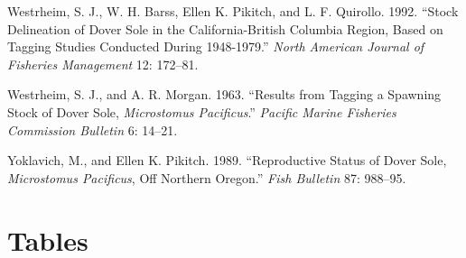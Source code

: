 \documentclass[11pt,
  english,
  a4paper,
]{article}
\begin{document}
\begin{cslreferences}
\leavevmode\hypertarget{ref-westrheim_stock_1992}{}%
Westrheim, S. J., W. H. Barss, Ellen K. Pikitch, and L. F. Quirollo. 1992. ``Stock Delineation of Dover Sole in the California-British Columbia Region, Based on Tagging Studies Conducted During 1948-1979.'' \emph{North American Journal of Fisheries Management} 12: 172--81.

\leavevmode\hypertarget{ref-westrheim_results_1963}{}%
Westrheim, S. J., and A. R. Morgan. 1963. ``Results from Tagging a Spawning Stock of Dover Sole, \emph{Microstomus Pacificus}.'' \emph{Pacific Marine Fisheries Commission Bulletin} 6: 14--21.

\leavevmode\hypertarget{ref-yoklavich_reproductive_1989}{}%
Yoklavich, M., and Ellen K. Pikitch. 1989. ``Reproductive Status of Dover Sole, \emph{Microstomus Pacificus}, Off Northern Oregon.'' \emph{Fish Bulletin} 87: 988--95.
\end{cslreferences}

\leavevmode\tagmcend\tagstructend

\clearpage


\hypertarget{tables}{%
\section{Tables}\label{tables}}

\leavevmode\tagmcend\tagstructend



\newpage

\begingroup\fontsize{10}{12}\selectfont
\begingroup\fontsize{10}{12}\selectfont
\end{document}
